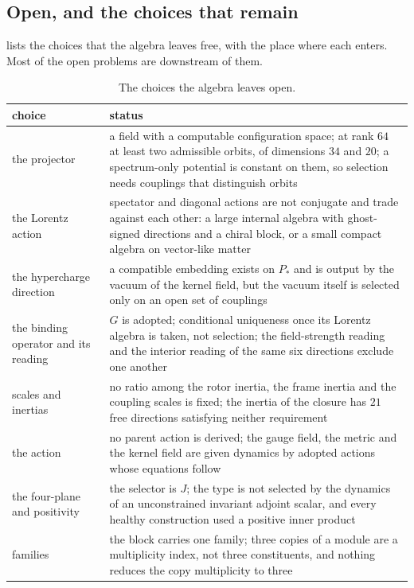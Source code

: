 \subsection{Open, and the choices that remain}
\label{sec:openchoices}

 lists the choices that the algebra leaves free, with the place where each enters. Most of the open problems are downstream of them.

\begin{table}[t]
\centering
\small
\begin{tabular}{@{}>{\raggedright\arraybackslash}p{4.0cm}>{\raggedright\arraybackslash}p{10.4cm}@{}}
\toprule
choice & status\\
\midrule
the projector & a field with a computable configuration space; at rank $64$ at least two admissible orbits, of dimensions $34$ and $20$; a spectrum-only potential is constant on
them, so selection needs couplings that distinguish orbits\\
the Lorentz action & spectator and diagonal actions are not conjugate and trade against each other: a large internal algebra with ghost-signed directions and a chiral block,
or a small compact algebra on vector-like matter\\
the hypercharge direction & a compatible embedding exists on $P_*$ and is output by the vacuum of the kernel field, but the vacuum itself is selected only on an open set of
couplings\\
the binding operator and its reading & $G$ is adopted; conditional uniqueness once its Lorentz algebra is taken, not selection; the field-strength reading and the interior reading
of the same six directions exclude one another\\
scales and inertias & no ratio among the rotor inertia, the frame inertia and the coupling scales is fixed; the inertia of the closure has $21$ free directions satisfying neither
requirement\\
the action & no parent action is derived; the gauge field, the metric and the kernel field are given dynamics by adopted actions whose equations follow\\
the four-plane and positivity & the selector is $J$; the type is not selected by the dynamics of an unconstrained invariant adjoint scalar, and every healthy
construction used a positive inner product\\
families & the block carries one family; three copies of a module are a multiplicity index, not three constituents, and nothing reduces the copy multiplicity to three\\
\bottomrule
\end{tabular}
\caption{The choices the algebra leaves open.}
\label{tab:choices}
\end{table}

